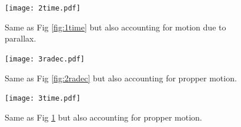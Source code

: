 \documentclass[preprint]{aastex}
\begin{document}
\begin{figure}
\begin{center}
    \texttt{[image: 2time.pdf]}
    \caption{Same as Fig \ref{fig:1time} but also accounting for motion due to parallax.}
    \label{fig:2time}
\end{center}
\end{figure}

\begin{figure}
\begin{center}
    \texttt{[image: 3radec.pdf]}
    \caption{Same as Fig \ref{fig:2radec} but also accounting for propper motion.}
    \label{fig:3radec}
\end{center}
\end{figure}

\begin{figure}
\begin{center}
    \texttt{[image: 3time.pdf]}
    \caption{Same as Fig \ref{fig:2time} but also accounting for propper motion.}
    \label{fig:3time}
\end{center}
\end{figure}





\end{document}
